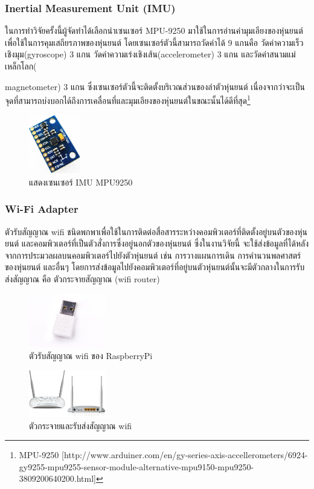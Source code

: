 \subsubsection*{Inertial Measurement Unit (IMU)}
ในการทำวิจัยครั้งนี้ผู้จัดทำได้เลือกนำเซนเซอร์ MPU-9250 มาใช้ในการอ่านค่ามุมเอียงของหุ่นยนต์เพื่อใช้ในการคุมเสถียรภาพของหุ่นยนต์
โดยเซนเซอร์ตัวนี้สามารถวัดค่าได้ 9 แกนคือ วัดค่าความเร็วเชิงมุม(gyroscope) 3 แกน วัดค่าความเร่งเชิงเส้น(accelerometer) 3 แกน
และวัดค่าสนามแม่เหล็กโลก({magnetometer) 3 แกน ซึ่งเซนเซอร์ตัวนี้จะติดตั้งบริเวณส่วนของลำตัวหุ่นยนต์
เนื่องจากว่าจะเป็นจุดที่สามารถบ่งบอกได้ถึงการเคลื่อนที่และมุมเอียงของหุ่นยนต์ในขณะนั้นได้ดีที่สุด\footnote{ MPU-9250 [http://www.arduiner.com/en/gy-series-axis-accellerometers/6924-gy9255-mpu9255-sensor-module-alternative-mpu9150-mpu9250-3809200640200.html] }
\begin{figure}[!ht]
    \centering
    \includegraphics[width=0.2\textwidth]{chapter3/images/mpu9250.jpeg}
    \caption{แสดงเซนเซอร์ IMU MPU9250}
    \label{fig:mpu9250}
\end{figure}

\subsubsection*{Wi-Fi Adapter}
ตัวรับสัญญาณ wifi ชนิดพกพาเพื่อใช้ในการติดต่อสื่อสารระหว่างคอมพิวเตอร์ที่ติดตั้งอยู่บนตัวของหุ่นยนต์
และคอมพิวเตอร์ที่เป็นตัวสั่งการซึ่งอยู่นอกตัวของหุ่นยนต์ ซึ่งในงานวิจัยนี้
จะใช้ส่งข้อมูลที่ได้หลังจากการประมวลผลบนคอมพิวเตอร์ไปยังตัวหุ่นยนต์ เช่น การวางแผนการเดิน การคำนวนพลศาสตร์ของหุ่นยนต์
และอื่นๆ โดยการส่งข้อมูลไปยังคอมพิวเตอร์ที่อยู่บนตัวหุ่นยนต์นั้นจะมีตัวกลางในการรับส่งสัญญาณ
คือ ตัวกระจายสัญญาณ (wifi router)
\begin{figure}[!ht]
    \centering
    \includegraphics[width=0.3\textwidth]{chapter3/images/rpi_wifi_adaptor.jpg}
    \caption{ตัวรับสัญญาณ wifi ของ RaspberryPi}
    \label{fig:rpi_wifi_adaptor}
\end{figure}
\begin{figure}[!ht]
    \centering
    \includegraphics[width=0.3\textwidth]{chapter3/images/wifi_router.jpg}
    \caption{ตัวกระจายและรับส่งสัญญาณ wifi}
    \label{fig:wifi_router}
\end{figure}


}
